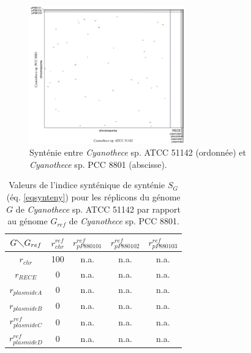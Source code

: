\begin{figure}[H]
   \begin{center}
   \includegraphics[width=0.6\textwidth]{./img/synteny/new/fig8_14.png}
   \caption[Synténie entre espèces multi-/monopartite de \textit{Cyanothece}]{Synténie entre \textit{Cyanothece} sp. ATCC 51142 (ordonnée) et \textit{Cyanothece} sp. PCC 8801 (abscisse).}\label{figsyntcyanothece}
   \end{center}
\end{figure}   

\begin{table}[H]
	\hspace{-1cm}
	\begin{minipage}{\textwidth}
	\begin{center}
	\caption[Valeurs de l'indice synténique pour \textit{Cyanothece}]{Valeurs de l'indice synténique de synténie $S_{G}$ (éq. \ref{eqsynteny}) pour les réplicons du génome $G$ de \textit{Cyanothece} sp. ATCC 51142 par rapport au génome $G_{ref}$ de \textit{Cyanothece} sp. PCC 8801.}\label{tablesyntcyanothece}
   \begin{tabular}{c|cccc}
    $G \diagdown G_{ref}$ & $r^{ref}_{chr}$ & $r^{ref}_{pP880101}$ & $r^{ref}_{pP880102}$ & $r^{ref}_{pP880103}$\\
   \hline
   $r_{chr}$ & 100 & n.a. & n.a. & n.a. \\
   $ r_{RECE}$ & 0 & n.a. & n.a. & n.a. \\
   $r_{plasmide A}$&0 & n.a. & n.a. & n.a. \\
   $r_{plasmide B}$&0 & n.a. & n.a. & n.a.\\
   $r^{ref}_{plasmide C}$&0 & n.a. & n.a. & n.a.\\
   $r^{ref}_{plasmide D}$&0 & n.a. & n.a. & n.a.\\
   \end{tabular}
   \end{center}
   \end{minipage}
   \end{table}	
   

